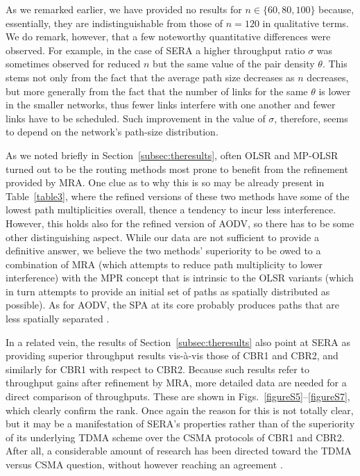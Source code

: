 \documentclass{article}
\begin{document}
As we remarked earlier, we have provided no results for $n\in\{60,80,100\}$
because, essentially, they are indistinguishable from those of $n=120$ in
qualitative terms. We do remark, however, that a few noteworthy quantitative
differences were observed. For example, in the case of SERA a higher throughput
ratio $\sigma$ was sometimes observed for reduced $n$ but the same value of the
pair density $\theta$. This stems not only from the fact that the average path
size decreases as $n$ decreases, but more generally from the fact that the
number of links for the same $\theta$ is lower in the smaller networks, thus
fewer links interfere with one another and fewer links have to be scheduled.
Such improvement in the value of $\sigma$, therefore, seems to depend on the
network's path-size distribution.

As we noted briefly in Section~\ref{subsec:theresults}, often OLSR and MP-OLSR
turned out to be the routing methods most prone to benefit from the refinement
provided by MRA. One clue as to why this is so may be already present in
Table~\ref{table3}, where the refined versions of these two methods have some
of the lowest path multiplicities overall, thence a tendency to incur less
interference. However, this holds also for the refined version of AODV, so there
has to be some other distinguishing aspect. While our data are not sufficient to
provide a definitive answer, we believe the two methods' superiority to be owed
to a combination of MRA (which attempts to reduce path multiplicity to lower
interference) with the MPR concept that is intrinsic to the OLSR variants (which
in turn attempts to provide an initial set of paths as spatially distributed as
possible). As for AODV, the SPA at its core probably produces paths that are
less spatially separated \cite{Jiazi2008,Biradar2010}.

In a related vein, the results of Section~\ref{subsec:theresults} also point at
SERA as providing superior throughput results vis-\`{a}-vis those of CBR1 and
CBR2, and similarly for CBR1 with respect to CBR2. Because such results refer to
throughput gains after refinement by MRA, more detailed data are needed for a
direct comparison of throughputs. These are shown in
Figs.~\ref{figureS5}--\ref{figureS7}, which clearly confirm the rank. Once again
the reason for this is not totally clear, but it may be a manifestation of
SERA's properties rather than of the superiority of its underlying TDMA scheme
over the CSMA protocols of CBR1 and CBR2. After all, a considerable amount of
research has been directed toward the TDMA versus CSMA question, without however
reaching an agreement
\cite{Ding2002,Gupta2007,Ashutosh2009,Banaouas2009}.
\end{document}
